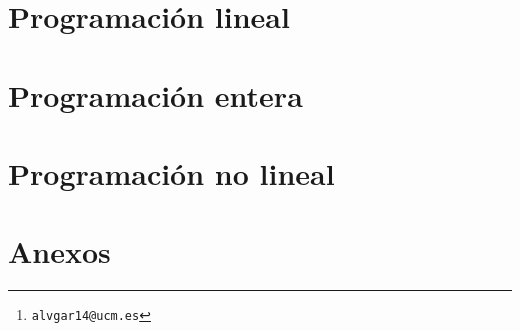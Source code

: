 \documentclass[a4paper, 10pt, twoside, titlepage, openright, onecolumn, final]{book}
\title{\tb{Investigación Operativa}}
\author{Álvaro García Tenorio
	\thanks{\texttt{alvgar14@ucm.es}}}
\date{\today}
\begin{document}
	\frontmatter
	\maketitle
	\tableofcontents
	
	
	\mainmatter
	\part{Programación lineal}
	
	
	
	\part{Programación entera}
	
	
	
	\part{Programación no lineal}
	\appendix
	\part{Anexos}
	
	\backmatter
	\printindex[general]
\end{document}
